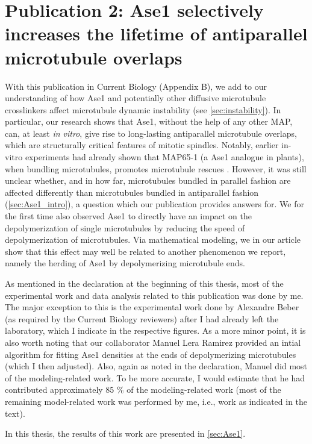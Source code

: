 \section{Publication 2: Ase1 selectively increases the lifetime of antiparallel microtubule overlaps}
With this publication in Current Biology \parencite{Krattenmacher2024} (Appendix B), we add to our understanding of how Ase1 and potentially other diffusive microtubule crosslinkers affect microtubule dynamic instability (see \autoref{sec:instability}). In particular, our research shows that Ase1, without the help of any other MAP, can, at least \textit{in vitro}, give rise to long-lasting antiparallel microtubule overlaps, which are structurally critical features of mitotic spindles. Notably, earlier in-vitro experiments had already shown that MAP65-1 (a Ase1 analogue in plants), when bundling microtubules, promotes microtubule rescues \parencite{Stoppin-Mellet2013}. However, it was still unclear whether, and in how far, microtubules bundled in parallel fashion are affected differently than microtubules bundled in antiparallel fashion (\autoref{sec:Ase1_intro}), a question which our publication provides answers for. We for the first time also observed Ase1 to directly have an impact on the depolymerization of single microtubules by reducing the speed of depolymerization of microtubules. Via mathematical modeling, we in our article show that this effect may well be related to another phenomenon we report, namely the herding of Ase1 by depolymerizing microtubule ends. \par

As mentioned in the declaration at the beginning of this thesis, most of the experimental work and data analysis related to this publication was done by me. The major exception to this is the experimental work done by Alexandre Beber (as required by the Current Biology reviewers) after I had already left the laboratory, which I indicate in the respective figures. As a more minor point, it is also worth noting that our collaborator Manuel Lera Ramirez provided an intial algorithm for fitting Ase1 densities at the ends of depolymerizing microtubules (which I then adjusted). Also, again as noted in the declaration, Manuel did most of the modeling-related work. To be more accurate, I would estimate that he had contributed approximately 85 \% of the modeling-related work (most of the remaining model-related work was performed by me, i.e., work as indicated in the text).\par

In this thesis, the results of this work are presented in \autoref{sec:Ase1}.
